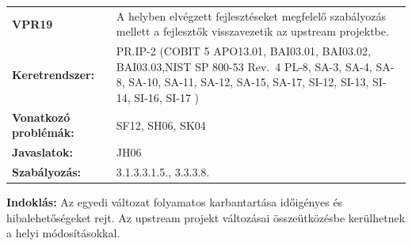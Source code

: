 \documentclass[12pt,magyar,a4paper,oneside]{scrreprt}
\begin{document}
\begin{longtable}[]{@{}ll@{}}
\toprule
\endhead
\begin{minipage}[t]{0.16\columnwidth}\raggedright
\textbf{VPR19}\strut
\end{minipage} & \begin{minipage}[t]{0.79\columnwidth}\raggedright
A helyben elvégzett fejlesztéseket megfelelő szabályozás mellett a
fejlesztők visszavezetik az upstream projektbe.\strut
\end{minipage}\tabularnewline
\begin{minipage}[t]{0.16\columnwidth}\raggedright
\textbf{Keretrendszer:}\strut
\end{minipage} & \begin{minipage}[t]{0.79\columnwidth}\raggedright
PR.IP-2 (COBIT 5 APO13.01, BAI03.01, BAI03.02, BAI03.03,NIST SP 800-53
Rev.~4 PL-8, SA-3, SA-4, SA-8, SA-10, SA-11, SA-12, SA-15, SA-17, SI-12,
SI-13, SI-14, SI-16, SI-17 )\strut
\end{minipage}\tabularnewline
\begin{minipage}[t]{0.16\columnwidth}\raggedright
\textbf{Vonatkozó problémák:}\strut
\end{minipage} & \begin{minipage}[t]{0.79\columnwidth}\raggedright
SF12, SH06, SK04\strut
\end{minipage}\tabularnewline
\begin{minipage}[t]{0.16\columnwidth}\raggedright
\textbf{Javaslatok:}\strut
\end{minipage} & \begin{minipage}[t]{0.79\columnwidth}\raggedright
JH06\strut
\end{minipage}\tabularnewline
\begin{minipage}[t]{0.16\columnwidth}\raggedright
\textbf{Szabályozás:}\strut
\end{minipage} & \begin{minipage}[t]{0.79\columnwidth}\raggedright
3.1.3.3.1.5., 3.3.3.8.\strut
\end{minipage}\tabularnewline
\bottomrule
\end{longtable}

\textbf{Indoklás: } Az egyedi változat folyamatos karbantartása
időigényes és hibalehetőségeket rejt. Az upstream projekt változásai
összeütközésbe kerülhetnek a helyi módosításokkal.
\end{document}
